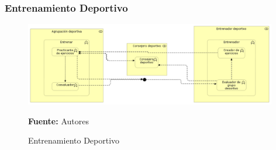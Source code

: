 \subsubsection{Entrenamiento Deportivo}

\begin{figure}[!htb]
  \begin{center}
    \includegraphics[width=11cm]{./imagenes/business_functions/entrenamientodeportivo.png}
    \caption{Entrenamiento Deportivo}
    \label{fig:entrenamiento_deportivo}
    \textbf{Fuente:}  Autores
  \end{center}
\end{figure}

